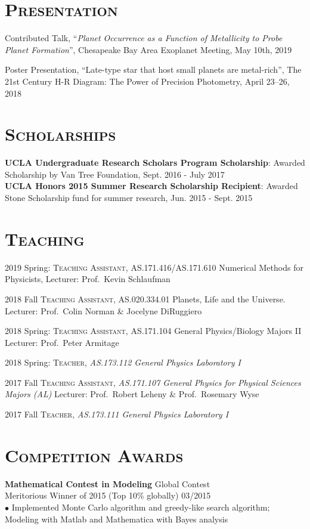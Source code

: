 \documentclass[line, margin]{res}
\begin{document}
\begin{resume}
\section{\textsc{Presentation}}
Contributed Talk, ``\textit{Planet Occurrence as a Function of Metallicity to Probe Planet Formation}'', Chesapeake Bay Area Exoplanet Meeting, May 10th, 2019

Poster Presentation, ``Late-type star that host small planets are metal-rich'', The 21st Century H-R Diagram: The Power of Precision Photometry, April 23--26, 2018
\section{\textsc{Scholarships} }
\textbf{UCLA Undergraduate Research Scholars Program Scholarship}: Awarded Scholarship by Van Tree Foundation, Sept. 2016 - July 2017\\
\textbf{UCLA Honors 2015 Summer Research Scholarship Recipient}: Awarded Stone Scholarship fund for summer research, Jun. 2015 - Sept. 2015

\section{\textsc{Teaching}}
2019 Spring: \textsc{Teaching Assistant}, AS.171.416/AS.171.610 Numerical Methods for Physicists, Lecturer: Prof.\ Kevin Schlaufman

2018 Fall \textsc{Teaching Assistant}, 	AS.020.334.01 Planets, Life and the Universe. 
Lecturer: Prof.\ Colin Norman \& Jocelyne DiRuggiero

2018 Spring: \textsc{Teaching Assistant}, AS.171.104 General Physics/Biology Majors II
Lecturer: Prof.\ Peter Armitage

2018 Spring: \textsc{Teacher}, \emph{AS.173.112 General Physics Laboratory I}

2017 Fall \textsc{Teaching Assistant}, \emph{AS.171.107 General Physics for Physical Sciences Majors (AL)} Lecturer: Prof.\ Robert Leheny \& Prof.\ Rosemary Wyse

2017 Fall \textsc{Teacher}, \emph{AS.173.111 General Physics Laboratory I}


\section{\textsc{Competition Awards}}
\textbf{Mathematical Contest in Modeling} \hfill  Global Contest\\
Meritorious Winner of 2015 (Top 10\% globally) \hfill 03/2015\\
$\bullet$ Implemented Monte Carlo algorithm and greedy-like search algorithm; Modeling with Matlab and Mathematica with Bayes analysis


\end{resume}
\end{document}
